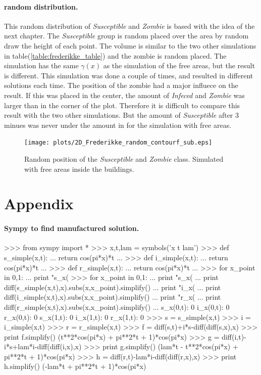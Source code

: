 \documentclass[%
twoside,                 %
final,                   %
10pt]{article}
\begin{document}
\noindent
\paragraph{random distribution.}
This random distribution of \emph{Susceptible} and \emph{Zombie} is based with the idea of the next chapter. The \emph{Susceptible} group is random placed over the area by random draw the height of each point. The volume is similar to the two other simulations in table(\ref{table:frederikke_table}) and the zombie is random placed. The simulation has the same $\gamma(x)$ as the simulation of the free areas, but the result is different. This simulation was done a couple of times, and resulted in different solutions each time. The position of the zombie had a major influece on the result. If this was placed in the center, the amount of \emph{Infeced} and \emph{Zombie} was larger than in the corner of the plot. Therefore it is difficult to compare this result with the two other simulations. But the amount of \emph{Susceptible} after 3 minues was never under the amount in for the simulation with free areas.  


\begin{figure}[ht]
  \centerline{\texttt{[image: plots/2D\_Frederikke\_random\_contourf\_sub.eps]}}
  \caption{
  \label{fig:frederikke_random} Random position of the \emph{Susceptible} and \emph{Zombie} class. Simulated with free areas inside the buildings.
  }
\end{figure}




\section{Appendix}
\paragraph{Sympy to find manufactured solution.}
\bpycod
>>> from sympy import *
>>> x,t,lam = symbols('x t lam')
>>> def s_simple(x,t):
...     return cos(pi*x)*t
... 
>>> def i_simple(x,t):
...     return cos(pi*x)*t
... 
>>> def r_simple(x,t):
...     return cos(pi*x)*t
... 
>>> for x_point in 0,1:
...     print "s_x(%
>>> for x_point in 0,1:
...     print "s_x(%
...     print diff(s_simple(x,t),x).subs(x,x_point).simplify()
...     print "i_x(%
...     print diff(i_simple(x,t),x).subs(x,x_point).simplify()
...     print "r_x(%
...     print diff(r_simple(x,t),x).subs(x,x_point).simplify()
... 
s_x(0,t):  0
i_x(0,t):  0
r_x(0,t):  0
s_x(1,t):  0
i_x(1,t):  0
r_x(1,t):  0
>>> s = s_simple(x,t)
>>> i = i_simple(x,t)
>>> r = r_simple(x,t)
>>> f = diff(s,t)+i*s-diff(diff(s,x),x)
>>> print f.simplify()
(t**2*cos(pi*x) + pi**2*t + 1)*cos(pi*x)
>>> g = diff(i,t)-i*s+lam*i-diff(diff(i,x),x)
>>> print g.simplify()
(lam*t - t**2*cos(pi*x) + pi**2*t + 1)*cos(pi*x)
>>> h = diff(r,t)-lam*i-diff(diff(r,x),x)
>>> print h.simplify()
(-lam*t + pi**2*t + 1)*cos(pi*x)
\epycod
\end{document}
